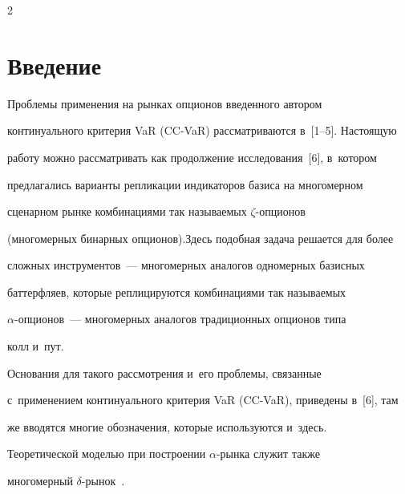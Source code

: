




\thispagestyle{headings}





\begin{multicols}{2}





\label{st\stat}


   


  \section{Введение}


  


  Проблемы применения на рынках опционов введенного автором 


континуального критерия VaR (CC-VaR) рассматриваются в~[1--5]. Настоящую 


работу можно рассматривать как продолжение исследования~[6], в~котором 


предлагались варианты репликации индикаторов базиса на многомерном 


сценарном рынке комбинациями так называемых $\zeta$-оп\-ци\-онов 


(многомерных бинарных опционов).\linebreak Здесь подобная задача решается для более 


сложных инструментов~--- многомерных аналогов одномерных базисных 


баттерфляев, которые реплицируются комбинациями так называемых


  $\alpha$-оп\-ци\-онов~--- многомерных аналогов традиционных \mbox{опционов} типа 


колл и~пут. 


  


  Основания для такого рассмотрения и~его проб\-ле\-мы, связанные 


с~применением континуального критерия VaR (CC-VaR), приведены в~[6], там 


же вводятся многие обозначения, которые используются и~здесь. 


Теоретической моделью при построении $\alpha$-рын\-ка служит также 


многомерный $\delta$-ры\-нок~\cite{5-aga, 6-aga}. 



\end{multicols}
